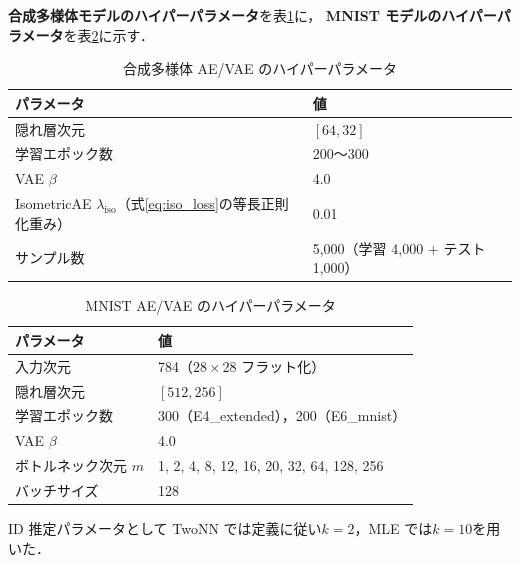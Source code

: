 \documentclass[12pt,a4paper]{jsarticle}
\begin{document}
\textbf{合成多様体モデルのハイパーパラメータ}を表\ref{tab:synthetic_hp}に，
\textbf{MNIST モデルのハイパーパラメータ}を表\ref{tab:mnist_hp}に示す．

\begin{table}[H]
\centering
\caption{合成多様体 AE/VAE のハイパーパラメータ}
\label{tab:synthetic_hp}
\begin{tabular}{ll}
\toprule
パラメータ & 値 \\
\midrule
隠れ層次元 & $[64, 32]$ \\
学習エポック数 & 200〜300 \\
VAE $\beta$ & 4.0 \\
IsometricAE $\lambda_{\mathrm{iso}}$（式\eqref{eq:iso_loss}の等長正則化重み） & 0.01 \\
サンプル数 & 5{,}000（学習 4{,}000 $+$ テスト 1{,}000） \\
\bottomrule
\end{tabular}
\end{table}

\begin{table}[H]
\centering
\caption{MNIST AE/VAE のハイパーパラメータ}
\label{tab:mnist_hp}
\begin{tabular}{ll}
\toprule
パラメータ & 値 \\
\midrule
入力次元 & 784（$28\times28$ フラット化） \\
隠れ層次元 & $[512, 256]$ \\
学習エポック数 & 300（E4\_extended），200（E6\_mnist） \\
VAE $\beta$ & 4.0 \\
ボトルネック次元 $m$ & 1, 2, 4, 8, 12, 16, 20, 32, 64, 128, 256 \\
バッチサイズ & 128 \\
\bottomrule
\end{tabular}
\end{table}

ID 推定パラメータとして TwoNN では定義に従い$k=2$，MLE では$k=10$を用いた．
\end{document}
